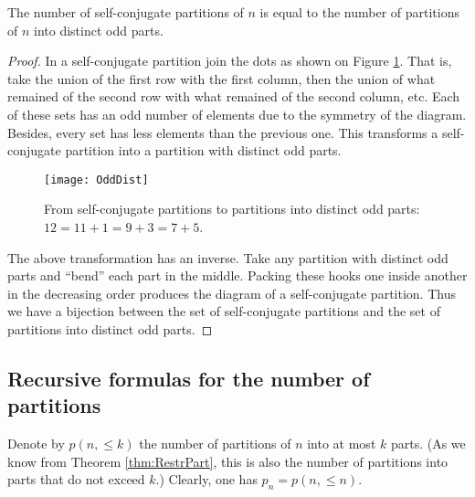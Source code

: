 \begin{page}

\begin{thm}
The number of self-conjugate partitions of $n$ is equal to the number of partitions of $n$ into distinct odd parts.
\end{thm}

\end{page}

\begin{page}

\begin{proof}
In a self-conjugate partition join the dots as shown on Figure \ref{fig:OddDist}.
That is, take the union of the first row with the first column,
then the union of what remained of the second row with what remained of the second column, etc.
Each of these sets has an odd number of elements due to the symmetry of the diagram.
Besides, every set has less elements than the previous one.
This transforms a self-conjugate partition into a partition with distinct odd parts.

\begin{figure}[ht]
\begin{center}
\texttt{[image: OddDist]}
\end{center}
\caption{From self-conjugate partitions to partitions into distinct odd parts: $12 = 11 + 1 = 9 + 3 = 7 + 5$.}
\label{fig:OddDist}
\end{figure}

The above transformation has an inverse.
Take any partition with distinct odd parts and ``bend'' each part in the middle.
Packing these hooks one inside another in the decreasing order produces the diagram of a self-conjugate partition.
Thus we have a bijection between the set of self-conjugate partitions and the set of partitions into distinct odd parts.
\end{proof}






\end{page}

\begin{page}

\subsection{Recursive formulas for the number of partitions}
Denote by $p(n, \le k)$ the number of partitions of $n$ into at most $k$ parts.
(As we know from Theorem \ref{thm:RestrPart}, this is also the number of partitions into parts that do not exceed $k$.)
Clearly, one has $p_n = p(n, \le n)$.



\end{page}

